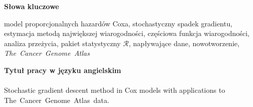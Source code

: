 \documentclass[]{mini}
\begin{document}
\begin{center}
\textbf{Słowa kluczowe} 
\end{center}
model proporcjonalnych hazardów Coxa, stochastyczny spadek gradientu, estymacja metodą największej wiarogodności, częściowa funkcja wiarogodności, analiza przeżycia, pakiet statystyczny $\mathcal{R}$, napływające dane, nowotworzenie, \textit{The~Cancer~Genome~Atlas} \ \\

\begin{center}
\textbf{Tytuł pracy w języku angielskim} \\ \ \\ \vspace{-10pt}
Stochastic gradient descent method in Cox models with applications to \\ The~Cancer~Genome~Atlas~data.
\end{center}



\tableofcontents













\appendix

%



\small

%


\makestatement
\end{document}
